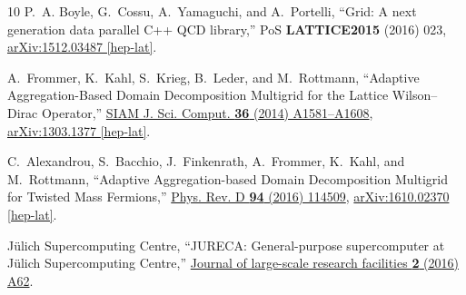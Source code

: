 \begin{thebibliography}{10}
P.~A. Boyle, G.~Cossu, A.~Yamaguchi, and A.~Portelli, ``{Grid: A next
  generation data parallel C++ QCD library},'' PoS {\bfseries LATTICE2015}
  (2016) 023,
\href{http://arxiv.org/abs/1512.03487}{{\ttfamily arXiv:1512.03487 [hep-lat]}}.

A.~Frommer, K.~Kahl, S.~Krieg, B.~Leder, and M.~Rottmann, ``{Adaptive
  Aggregation-Based Domain Decomposition Multigrid for the Lattice
  Wilson--Dirac Operator},'' \href{http://dx.doi.org/10.1137/130919507}{SIAM J.
  Sci. Comput. {\bfseries 36} (2014) A1581--A1608},
\href{http://arxiv.org/abs/1303.1377}{{\ttfamily arXiv:1303.1377 [hep-lat]}}.

C.~Alexandrou, S.~Bacchio, J.~Finkenrath, A.~Frommer, K.~Kahl, and M.~Rottmann,
  ``{Adaptive Aggregation-based Domain Decomposition Multigrid for Twisted Mass
  Fermions},'' \href{http://dx.doi.org/10.1103/PhysRevD.94.114509}{Phys. Rev. D
  {\bfseries 94} (2016) 114509},
\href{http://arxiv.org/abs/1610.02370}{{\ttfamily arXiv:1610.02370 [hep-lat]}}.

{Jülich Supercomputing Centre}, ``{JURECA: General-purpose supercomputer at
  Jülich Supercomputing Centre},''
  \href{http://dx.doi.org/10.17815/jlsrf-2-121}{Journal of large-scale research
  facilities {\bfseries 2} (2016) A62}.

\end{thebibliography}\endgroup
